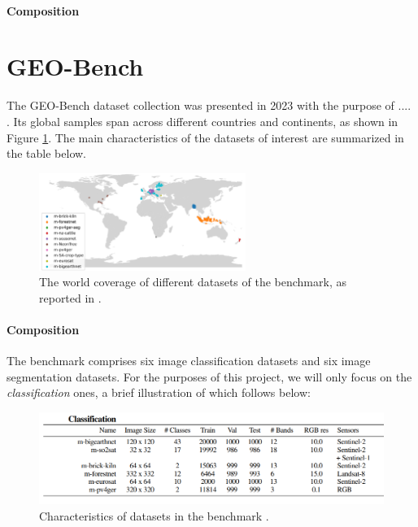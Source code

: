\documentclass[a4paper, oneside, english]{sapthesis}
\begin{document}
\paragraph{Composition}



\section{GEO-Bench}

The GEO-Bench dataset collection \cite{lacoste2023geo} was presented in 2023 with the purpose of .... . Its global samples span across different countries and continents, as shown in Figure \ref{fig:geoworld}. The main characteristics of the datasets of interest are summarized in the table below. 

\begin{figure}[h]
    \centering
    \includegraphics[width=0.6\textwidth]{img/geobench_world_coverage.png}
    \caption{The world coverage of different datasets of the benchmark, as reported in \cite{lacoste2023geo}.}
    \label{fig:geoworld}
\end{figure}

\paragraph{Composition}

The benchmark comprises six image classification datasets and six image segmentation datasets. For the purposes of this project, we will only focus on the \emph{classification} ones, a brief illustration of which follows below: \\

\begin{figure}[h]
    \centering
    \includegraphics[width=\textwidth]{img/geobench-datasets-classification-info-cut.png}
    \caption{Characteristics of datasets in the benchmark \cite{lacoste2023geo}.}
    \label{fig:geoinfo}
\end{figure}
\end{document}
